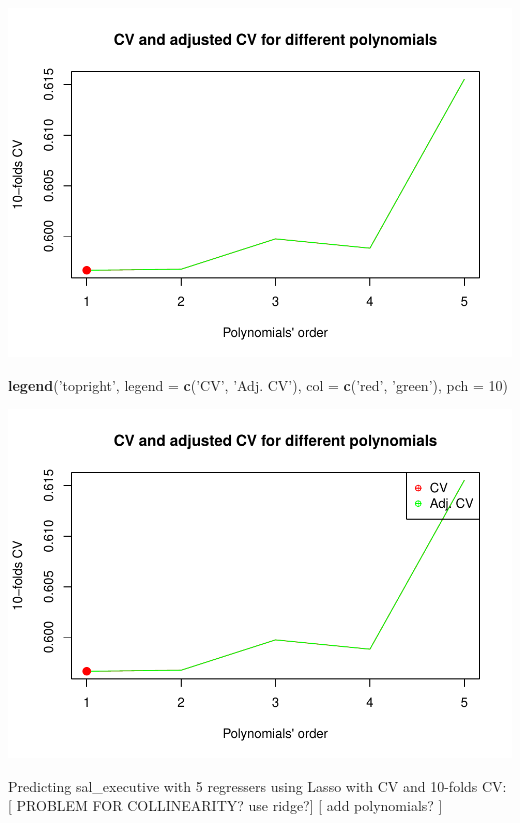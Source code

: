 \documentclass[]{article}
\newenvironment{Shaded}{\begin{snugshade}}{\end{snugshade}}
\newcommand{\KeywordTok}[1]{\textcolor[rgb]{0.13,0.29,0.53}{\textbf{#1}}}
\newcommand{\DataTypeTok}[1]{\textcolor[rgb]{0.13,0.29,0.53}{#1}}
\newcommand{\DecValTok}[1]{\textcolor[rgb]{0.00,0.00,0.81}{#1}}
\newcommand{\StringTok}[1]{\textcolor[rgb]{0.31,0.60,0.02}{#1}}
\newcommand{\NormalTok}[1]{#1}
\begin{document}
\includegraphics{TSLproject_files/figure-latex/unnamed-chunk-16-3.pdf}

\begin{Shaded}
\begin{Highlighting}[]
\KeywordTok{legend}\NormalTok{(}\StringTok{'topright'}\NormalTok{, }\DataTypeTok{legend =} \KeywordTok{c}\NormalTok{(}\StringTok{'CV'}\NormalTok{, }\StringTok{'Adj. CV'}\NormalTok{), }\DataTypeTok{col =} \KeywordTok{c}\NormalTok{(}\StringTok{'red'}\NormalTok{, }\StringTok{'green'}\NormalTok{), }\DataTypeTok{pch =} \DecValTok{10}\NormalTok{)}
\end{Highlighting}
\end{Shaded}

\includegraphics{TSLproject_files/figure-latex/unnamed-chunk-16-4.pdf}

Predicting sal\_executive with 5 regressers using Lasso with CV and
10-folds CV: {[} PROBLEM FOR COLLINEARITY? use ridge?{]} {[} add
polynomials? {]}
\end{document}
